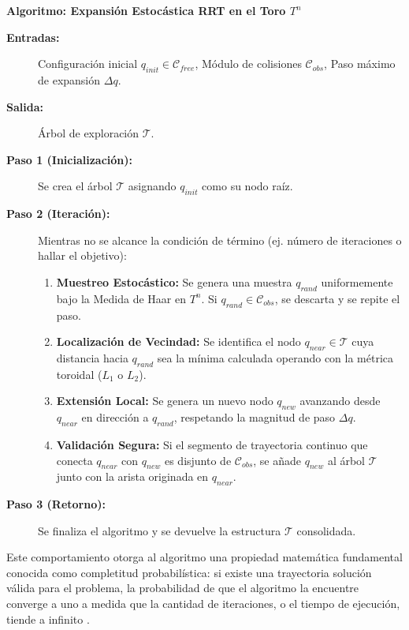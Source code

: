 \vspace{0.3cm}
\noindent\textbf{Algoritmo: Expansión Estocástica RRT en el Toro $T^n$}
\begin{description}
    \item[\textbf{Entradas:}] Configuración inicial $q_{init} \in \mathcal{C}_{free}$, Módulo de colisiones $\mathcal{C}_{obs}$, Paso máximo de expansión $\Delta q$.
    \item[\textbf{Salida:}] Árbol de exploración $\mathcal{T}$.
    
    \item[\textbf{Paso 1 (Inicialización):}] Se crea el árbol $\mathcal{T}$ asignando $q_{init}$ como su nodo raíz.
    
    \item[\textbf{Paso 2 (Iteración):}] Mientras no se alcance la condición de término (ej. número de iteraciones o hallar el objetivo):
    \begin{enumerate}
        \item \textbf{Muestreo Estocástico:} Se genera una muestra $q_{rand}$ uniformemente bajo la Medida de Haar en $T^n$. Si $q_{rand} \in \mathcal{C}_{obs}$, se descarta y se repite el paso.
        \item \textbf{Localización de Vecindad:} Se identifica el nodo $q_{near} \in \mathcal{T}$ cuya distancia hacia $q_{rand}$ sea la mínima calculada operando con la métrica toroidal ($L_1$ o $L_2$).
        \item \textbf{Extensión Local:} Se genera un nuevo nodo $q_{new}$ avanzando desde $q_{near}$ en dirección a $q_{rand}$, respetando la magnitud de paso $\Delta q$.
        \item \textbf{Validación Segura:} Si el segmento de trayectoria continuo que conecta $q_{near}$ con $q_{new}$ es disjunto de $\mathcal{C}_{obs}$, se añade $q_{new}$ al árbol $\mathcal{T}$ junto con la arista originada en $q_{near}$.
    \end{enumerate}
    
    \item[\textbf{Paso 3 (Retorno):}] Se finaliza el algoritmo y se devuelve la estructura $\mathcal{T}$ consolidada.
\end{description}
\vspace{0.3cm}

Este comportamiento otorga al algoritmo una propiedad matemática fundamental conocida como 
completitud probabilística: si existe una trayectoria solución válida para el problema, 
la probabilidad de que el algoritmo la encuentre converge a uno a medida que la cantidad de 
iteraciones, o el tiempo de ejecución, tiende a infinito \parencite{Choset2005}.

